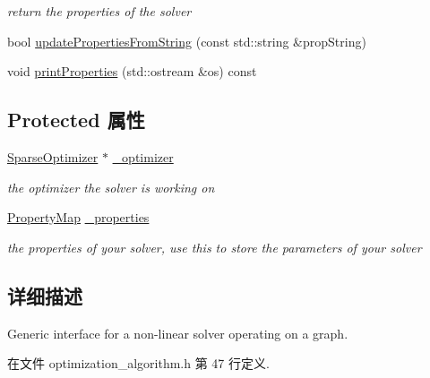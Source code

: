 \begin{DoxyCompactItemize}
\begin{DoxyCompactList}\small\item\em return the properties of the solver \end{DoxyCompactList}\item 
bool \hyperlink{classg2o_1_1OptimizationAlgorithm_aa05a6380f936c728a574c7c272bcc524}{update\-Properties\-From\-String} (const std\-::string \&prop\-String)
\item 
void \hyperlink{classg2o_1_1OptimizationAlgorithm_ad07be53fd879acfb919ca7d3ef73e97b}{print\-Properties} (std\-::ostream \&os) const 
\end{DoxyCompactItemize}
\subsection*{Protected 属性}
\begin{DoxyCompactItemize}
\item 
\hypertarget{classg2o_1_1OptimizationAlgorithm_a6017c344be0d9f09d6674849849c6b60}{\hyperlink{classg2o_1_1SparseOptimizer}{Sparse\-Optimizer} $\ast$ \hyperlink{classg2o_1_1OptimizationAlgorithm_a6017c344be0d9f09d6674849849c6b60}{\-\_\-optimizer}}\label{classg2o_1_1OptimizationAlgorithm_a6017c344be0d9f09d6674849849c6b60}

\begin{DoxyCompactList}\small\item\em the optimizer the solver is working on \end{DoxyCompactList}\item 
\hypertarget{classg2o_1_1OptimizationAlgorithm_ae37b494f69b483a3fcafa944e987e325}{\hyperlink{classg2o_1_1PropertyMap}{Property\-Map} \hyperlink{classg2o_1_1OptimizationAlgorithm_ae37b494f69b483a3fcafa944e987e325}{\-\_\-properties}}\label{classg2o_1_1OptimizationAlgorithm_ae37b494f69b483a3fcafa944e987e325}

\begin{DoxyCompactList}\small\item\em the properties of your solver, use this to store the parameters of your solver \end{DoxyCompactList}\end{DoxyCompactItemize}


\subsection{详细描述}
Generic interface for a non-\/linear solver operating on a graph. 

在文件 optimization\-\_\-algorithm.\-h 第 47 行定义.



